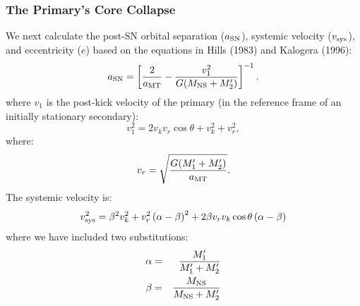 \documentclass[12pt, preprint]{aastex}
\begin{document}

\subsubsection{The Primary's Core Collapse} \label{sec:trans_SN}

We next calculate the post-SN orbital separation ($a_{\rm SN}$), systemic velocity ($v_{\rm sys}$), and eccentricity ($e$) based on the equations in Hills (1983) and Kalogera (1996):
\begin{equation}
a_{\rm SN} = \left[ \frac{2 }{a_{\rm MT}}  - \frac{v_1^2}{G(M_{\rm NS} + M_2')} \right]^{-1}. \label{eq:SN_A} \\
\end{equation}
where $v_1$ is the post-kick velocity of the primary (in the reference frame of an initially stationary secondary):
\begin{equation}
v_1^2 = 2v_k v_r \cos \theta + v_k^2 + v_r^2, \label{eq:v_1}
\end{equation}
where:
\begin{equation}
v_r = \sqrt{\frac{G (M_1' + M_2')}{a_{\rm MT}}}. \label{eq:v_r}
\end{equation}
The systemic velocity is:
\begin{equation}
v_{\rm sys}^2 = \beta^2 v_k^2
   + v_r^2 \left( \alpha - \beta \right)^2
   + 2 \beta v_r v_k \cos \theta \left( \alpha - \beta \right)
    \label{eq:SN_v_sys}
\end{equation}
where we have included two substitutions:
\begin{eqnarray}
\alpha &=& \frac{M_1'}{M_1' + M_2'} \\
\beta &=& \frac{M_{\rm NS}}{M_{\rm NS} + M_2'}
\end{eqnarray}
\end{document}
